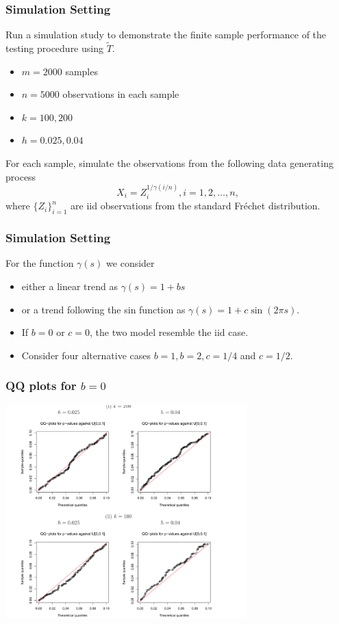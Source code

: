 \documentclass{beamer}
\begin{document}
\begin{frame}
    \frametitle{Simulation Setting}
Run a simulation study to demonstrate the finite sample performance of the testing procedure using $\tilde{T}$.

\begin{itemize}
    \item $m=2000$ samples
    \item  $n=5000$ observations in each sample
    \item  $k=100,200$
    \item  $h=0.025,0.04$
\end{itemize}
  
    
    For each sample,  simulate the observations from the following data generating process
    $$
    X_i=Z_i^{1/\gamma(i/n)}, i=1,2,\dots,n,
    $$
    where $\{Z_i\}_{i=1}^n$ are iid observations from the standard Fr\'echet distribution.
\end{frame}

\begin{frame}
    \frametitle{Simulation Setting}
    For the function $\gamma(s)$ we consider 
    \begin{itemize}
        \item  either a linear trend as $\gamma(s)=1+bs$
        \item  or a trend following the sin function as $\gamma(s)=1+c\sin(2\pi s)$.
        \item 
        If $b=0$ or $c=0$, the two model resemble the iid case.
        \item     
        Consider four alternative cases $b=1, b=2, c=1/4$ and $c=1/2$.
    \end{itemize}
\end{frame}



\begin{frame}
    \frametitle{QQ plots for $b=0$}
\begin{center}
    \includegraphics[width=0.7\textwidth]{QQ.png}
\end{center}
\end{frame}
\end{document}
